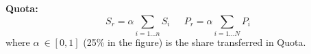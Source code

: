 \begin{f}
\textbf{Quota:}
\[
S_r=\alpha \sum_{i=1\ldots n}S_i\quad \ \ P_r=\alpha\sum_{i=1\ldots N}P_i 
\]
where \(\alpha\ \in [0,1]\) (25\% in the figure) is the share transferred in Quota.
	

	

\end{f}
